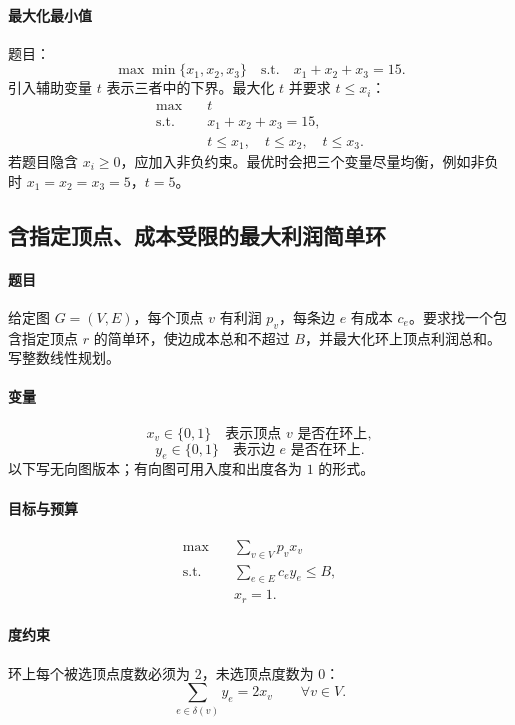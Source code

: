 \documentclass[UTF8,openany,12pt]{ctexbook}
\theoremstyle{remark}
\begin{document}
\paragraph{最大化最小值}
题目：
\[
  \max \min\{x_1,x_2,x_3\}
  \quad\text{s.t.}\quad
  x_1+x_2+x_3=15.
\]
引入辅助变量 $t$ 表示三者中的下界。最大化 $t$ 并要求 $t\le x_i$：
\[
\begin{aligned}
  \max\quad &t\\
  \text{s.t.}\quad &x_1+x_2+x_3=15,\\
  &t\le x_1,\quad t\le x_2,\quad t\le x_3.
\end{aligned}
\]
若题目隐含 $x_i\ge0$，应加入非负约束。最优时会把三个变量尽量均衡，例如非负时
$x_1=x_2=x_3=5$，$t=5$。

\subsection{含指定顶点、成本受限的最大利润简单环}

\paragraph{题目}
给定图 $G=(V,E)$，每个顶点 $v$ 有利润 $p_v$，每条边 $e$ 有成本 $c_e$。要求找一个包含指定顶点 $r$ 的简单环，使边成本总和不超过 $B$，并最大化环上顶点利润总和。写整数线性规划。

\paragraph{变量}
\[
  x_v\in\{0,1\}\quad \text{表示顶点 }v\text{ 是否在环上},
\]
\[
  y_e\in\{0,1\}\quad \text{表示边 }e\text{ 是否在环上}.
\]
以下写无向图版本；有向图可用入度和出度各为 $1$ 的形式。

\paragraph{目标与预算}
\[
\begin{aligned}
  \max\quad &\sum_{v\in V}p_vx_v\\
  \text{s.t.}\quad &\sum_{e\in E}c_ey_e\le B,\\
  &x_r=1.
\end{aligned}
\]

\paragraph{度约束}
环上每个被选顶点度数必须为 $2$，未选顶点度数为 $0$：
\[
  \sum_{e\in\delta(v)}y_e=2x_v\qquad \forall v\in V.
\]
\end{document}
